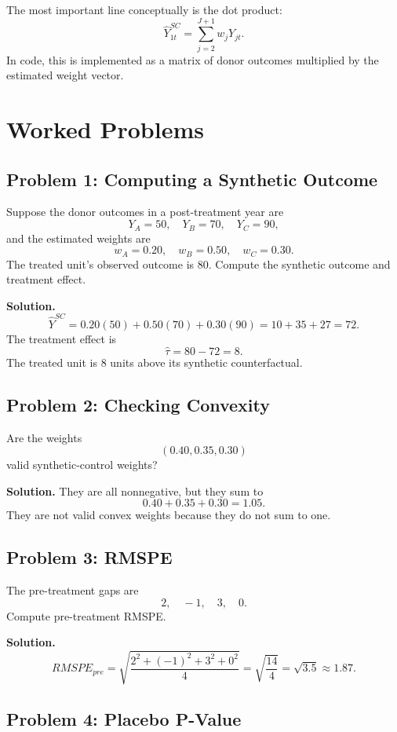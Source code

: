 The most important line conceptually is the dot product:
\[
\widehat{Y}^{SC}_{1t}=\sum_{j=2}^{J+1}w_jY_{jt}.
\]
In code, this is implemented as a matrix of donor outcomes multiplied by the estimated weight vector.

\section{Worked Problems}

\subsection*{Problem 1: Computing a Synthetic Outcome}

Suppose the donor outcomes in a post-treatment year are
\[
Y_A=50,\quad Y_B=70,\quad Y_C=90,
\]
and the estimated weights are
\[
w_A=0.20,\quad w_B=0.50,\quad w_C=0.30.
\]
The treated unit's observed outcome is \(80\). Compute the synthetic outcome and treatment effect.

\textbf{Solution.}
\[
\widehat{Y}^{SC}
=0.20(50)+0.50(70)+0.30(90)
=10+35+27
=72.
\]
The treatment effect is
\[
\widehat{\tau}=80-72=8.
\]
The treated unit is 8 units above its synthetic counterfactual.

\subsection*{Problem 2: Checking Convexity}

Are the weights
\[
(0.40,0.35,0.30)
\]
valid synthetic-control weights?

\textbf{Solution.} They are all nonnegative, but they sum to
\[
0.40+0.35+0.30=1.05.
\]
They are not valid convex weights because they do not sum to one.

\subsection*{Problem 3: RMSPE}

The pre-treatment gaps are
\[
2,\quad -1,\quad 3,\quad 0.
\]
Compute pre-treatment RMSPE.

\textbf{Solution.}
\[
RMSPE_{pre}
=
\sqrt{\frac{2^2+(-1)^2+3^2+0^2}{4}}
=
\sqrt{\frac{14}{4}}
=
\sqrt{3.5}
\approx 1.87.
\]

\subsection*{Problem 4: Placebo P-Value}


